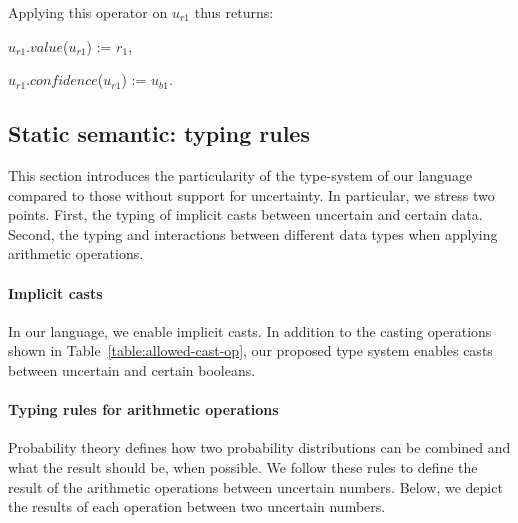 Applying this operator on $u_{r1}$ thus returns:
\begin{itemize*}
	\item[] $u_{r1}$.$value$($u_{r1}$) := $r_1$,
	\item[] $u_{r1}$.$confidence$($u_{r1}$) := $u_{b1}$.
\end{itemize*}

\subsection{Static semantic: typing rules}
\label{subsec:type-system}
This section introduces the particularity of the type-system of our language compared to those without support for uncertainty. 
In particular, we stress two points.
First, the typing of implicit casts between uncertain and certain data.
Second, the typing and interactions between different data types when applying arithmetic operations.

\paragraph{Implicit casts}
In our language, we enable implicit casts.
In addition to the casting operations shown in Table~\ref{table:allowed-cast-op}, our proposed type system enables casts between uncertain and certain booleans.

\paragraph{Typing rules for arithmetic operations}
Probability theory defines how two probability distributions can be combined and what the result should be, when possible.
We follow these rules to define the result of the arithmetic operations between uncertain numbers.
Below, we depict the results of each operation between two uncertain numbers.

\begin{table}
	\begin{center}
	\end{center}
	\caption{Typing rules for arithmetic operations}
	\label{table:typing-rules-arth-op}
\end{table}

